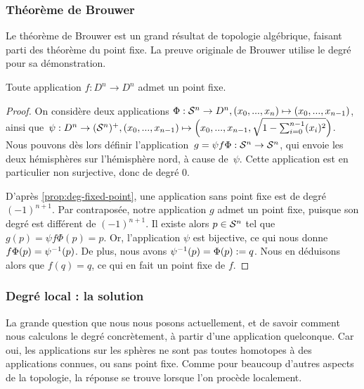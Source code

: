 \subsubsection{Théorème de Brouwer}

Le théorème de Brouwer est un grand résultat de topologie algébrique, faisant parti des théorème du point fixe. La preuve originale de Brouwer utilise le degré pour sa démonstration.

\begin{theorem}
Toute application $f:D^n\to D^n$ admet un point fixe.
\end{theorem}
\begin{proof}
On considère deux applications $\Phi:\mathcal{S}^{n}\to D^n,(x_0,...,x_n)\mapsto(x_0,...,x_{n-1})$, ainsi que~${\psi:D^n\to(\mathcal{S}^{n})^+,(x_0,...,x_{n-1})\mapsto \Big(x_0,...,x_{n-1},\sqrt{1-\sum_{i=0}^{n-1}(x_i)^2}\Big)}$. Nous pouvons dès lors définir l'application~${g=\psi f\Phi:\mathcal{S}^{n}\to \mathcal{S}^{n}}$, qui envoie les deux hémisphères sur l'hémisphère nord, à cause de~$\psi$. Cette application est en particulier non surjective, donc de degré 0. 

D'après \ref{prop:deg-fixed-point}, une application sans point fixe est de degré $(-1)^{n+1}$. Par contraposée, notre application $g$ admet un point fixe, puisque son degré est différent de $(-1)^{n+1}$. Il existe alors $p\in \mathcal{S}^{n}$ tel que $g(p)=\psi f\Phi(p)=p$. Or, l'application $\psi$ est bijective, ce qui nous donne $f\Phi(p)=\psi^{-1}(p)$. De plus, nous avons $\psi^{-1}(p)=\Phi(p):=q$. Nous en déduisons alors que $f(q)=q$, ce qui en fait un point fixe de $f$.
\end{proof}

\subsubsection{Degré local : la solution}

La grande question que nous nous posons actuellement, et de savoir comment nous calculons le degré concrètement, à partir d'une application quelconque. Car oui, les applications sur les sphères ne sont pas toutes homotopes à des applications connues, ou sans point fixe. Comme pour beaucoup d'autres aspects de la topologie, la réponse se trouve lorsque l'on procède localement.


